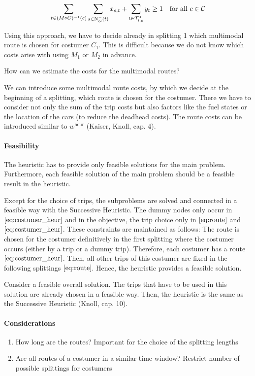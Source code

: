 \begin{align}
\label{eq:costumer_heur}
	\sum_{t\in(M\circ C)^{-1}(c)} \sum_{s\in\operatorname{N}_G^-(t)} x_{s,t} + \sum_{t\in\mathcal{T}^{\operatorname{d}}_{i,c}} y_t \geq 1 & & \text{for all } c\in\mathcal{C}
\end{align}

Using this approach, we have to decide already in splitting 1 which multimodal route is chosen for costumer $C_1$. This is difficult because we do not know which costs arise with using $M_1$ or $M_2$ in advance.

\begin{question}

How can we estimate the costs for the multimodal routes?

\end{question}

We can introduce some multimodal route costs, by which we decide at the beginning of a splitting, which route is chosen for the costumer. There we have to consider not only the sum of the trip costs but also factors like the fuel states or the location of the cars (to reduce the deadhead costs). The route costs can be introduced similar to $w^{\operatorname{heur}}$ (Kaiser, Knoll, cap. 4).

\paragraph{Feasibility} \parfill

The heuristic has to provide only feasible solutions for the main problem. Furthermore, each feasible solution of the main problem should be a feasible result in the heuristic. 

Except for the choice of trips, the subproblems are solved and connected in a feasible way with the Successive Heuristic. The dummy nodes only occur in $\eqref{eq:costumer_heur}$ and in the objective, the trip choice only in $\eqref{eq:route}$ and $\eqref{eq:costumer_heur}$. These constraints are maintained as follows: The route is chosen for the costumer definitively in the first splitting where the costumer occurs (either by a trip or a dummy trip). Therefore, each costumer has a route $\eqref{eq:costumer_heur}$. Then, all other trips of this costumer are fixed in the following splittings $\eqref{eq:route}$. Hence, the heuristic provides a feasible solution. 

Consider a feasible overall solution. The trips that have to be used in this solution are already chosen in a feasible way. Then, the heuristic is the same as the Successive Heuristic (Knoll, cap. 10).

\paragraph{Considerations}

\begin{enumerate}
	\item{How long are the routes? Important for the choice of the splitting lengths}
	\item{Are all routes of a costumer in a similar time window? Restrict number of possible splittings for costumers}
\end{enumerate}